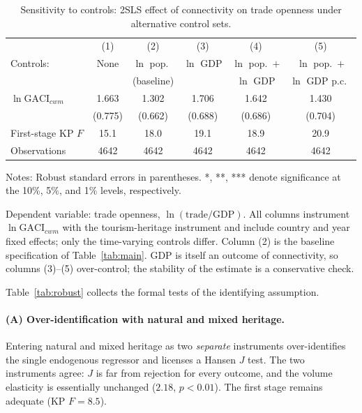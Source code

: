 \begin{table}[t]
\centering
\caption{Sensitivity to controls: 2SLS effect of connectivity on trade
openness under alternative control sets.}
\label{tab:controls}
\begin{threeparttable}
\small
\begin{tabular}{lccccc}
\toprule
 & (1) & (2) & (3) & (4) & (5) \\
Controls: & None & $\ln$ pop.\ & $\ln$ GDP & $\ln$ pop.\ $+$ & $\ln$ pop.\ $+$ \\
 & & (baseline) & & $\ln$ GDP & $\ln$ GDP p.c.\ \\
\midrule
$\ln\mathrm{GACI}_{cwm}$ & 1.663\sym{**} & 1.302\sym{**} & 1.706\sym{**} & 1.642\sym{**} & 1.430\sym{**} \\
 & (0.775) & (0.662) & (0.688) & (0.686) & (0.704) \\
\midrule
First-stage KP $F$ & 15.1 & 18.0 & 19.1 & 18.9 & 20.9 \\
Observations & 4642 & 4642 & 4642 & 4642 & 4642 \\
\bottomrule
\end{tabular}
\begin{tablenotes}\footnotesize
\item Notes: Robust standard errors in parentheses. *, **, *** denote
significance at the 10\%, 5\%, and 1\% levels, respectively.
\item Dependent variable: trade openness, $\ln(\text{trade}/\text{GDP})$. All
columns instrument $\ln\mathrm{GACI}_{cwm}$ with the tourism-heritage
instrument and include country and year fixed effects; only the time-varying
controls differ. Column (2) is the baseline specification of
Table~\ref{tab:main}. GDP is itself an outcome of connectivity, so columns
(3)--(5) over-control; the stability of the estimate is a conservative check.
\end{tablenotes}
\end{threeparttable}
\end{table}

Table~\ref{tab:robust} collects the formal tests of the identifying assumption.

\paragraph{(A) Over-identification with natural and mixed heritage.} Entering
natural and mixed heritage as two \emph{separate} instruments over-identifies
the single endogenous regressor and licenses a Hansen $J$ test. The two
instruments agree: $J$ is far from rejection for every outcome, and the volume
elasticity is essentially unchanged ($2.18$, $p<0.01$). The first stage remains
adequate (KP $F=8.5$).

